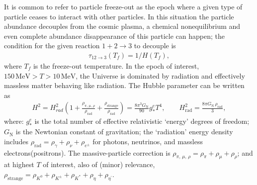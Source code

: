 It is common to refer to particle freeze-out as the epoch where a given type of particle ceases to interact with other particles. In this situation the particle abundance decouples from the cosmic plasma, a chemical nonequilibrium and even complete abundance disappearance of this particle can happen; the condition for the given reaction $1+2\rightarrow 3$ to decouple is
\begin{align}
\tau_{12\rightarrow 3}(T_f)=1/H(T_f),
\end{align}
where $T_f$ is the freeze-out temperature.
In the epoch of interest, $150\,\mathrm{MeV}>T>10\,\mathrm{MeV}$, the Universe is dominated by radiation and effectively massless matter behaving like radiation. The Hubble parameter can be written as~\cite{Kolb:1990vq}
\begin{align}\label{H2g}
H^2=H^2_{rad}\left(1+\frac{\rho_{\pi,\,\mu,\,\rho}}{\rho_\mathrm{rad}}+\frac{\rho_\mathrm{strange}}{\rho_\mathrm{rad}}\right)=\frac{8\pi^3G_\mathrm{N}}{90}g^e_\ast T^4,\qquad H^2_\mathrm{rad}=\frac{8\pi G_\mathrm{N}\,\rho_\mathrm{rad}}{3},
\end{align}
where: $g^e_\ast$ is the total number of effective relativistic `energy' degrees of freedom; $G_\mathrm{N}$ is the Newtonian constant of gravitation; the `radiation' energy density includes $\rho_\mathrm{rad}=\rho_\gamma+\rho_\nu+\rho_{e^\pm}$ for photons, neutrinos, and massless electrons(positrons). The massive-particle correction is $\rho_{\pi,\,\mu,\,\rho}=\rho_\pi+\rho_\mu+\rho_\rho$; and at highest $T$ of interest, also of (minor) relevance, $\rho_\mathrm{strange}=\rho_{K^0}+\rho_{K^\pm}+\rho_{K^\ast}+\rho_{\eta}+\rho_{\eta^\prime}$.
